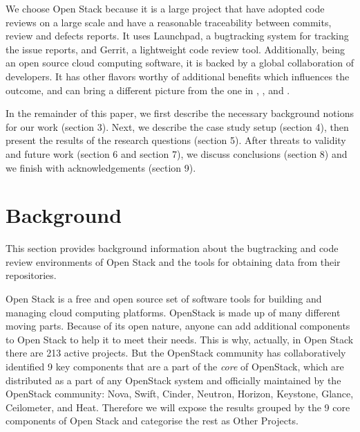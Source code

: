 \documentclass[ifip]{svmult}
\begin{document}
We choose Open Stack because it is a large project that have adopted code reviews on a large 
scale and have a reasonable traceability between commits, review and defects reports.
It uses Launchpad, a bugtracking system for tracking the issue reports, and Gerrit, a lightweight code review tool. Additionally, 
being an open source cloud computing software, it is backed by a global collaboration of developers. It has other flavors worthy of 
additional benefits which influences the outcome, and can bring a different picture from the one in \cite{contribution1}, 
\cite{contribution9}, \cite{contribution20} and \cite{contribution10}. 

In the remainder of this paper, we first describe the necessary background notions for our work (section 3). Next, we describe the 
case study setup (section 4), then present the results of the research questions (section 5). After threats to 
validity and future work (section 6 and section 7), we discuss conclusions (section 8) and we finish with acknowledgements (section 9).

\section{Background}
\label{sec:3}

This section provides background information about the bugtracking and code review environments of Open Stack and the 
tools for obtaining data from their repositories.

Open Stack is a free and open source set of software tools for building and managing cloud computing platforms. 
OpenStack is made up of many different moving parts. Because of its open nature, anyone can add additional components to Open Stack 
to help it to meet their needs. This is why, actually, in Open Stack there are 213 active projects. 
But the OpenStack community has collaboratively identified 9 key components that are a part of 
the \textit{core} of OpenStack, which are distributed as a part of any OpenStack system and officially maintained by the OpenStack 
community: Nova, Swift, Cinder, Neutron, Horizon, Keystone, Glance, Ceilometer, and Heat.
Therefore we will expose the results grouped by the 9 core components of Open Stack and categorise the rest as Other Projects.
\end{document}
